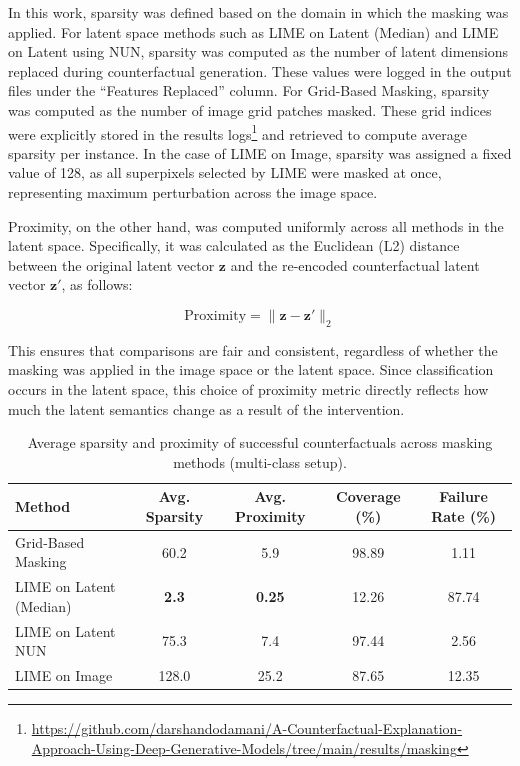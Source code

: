 In this work, sparsity was defined based on the domain in which the masking was applied. For latent space methods such as LIME on Latent (Median) and LIME on Latent using NUN, sparsity was computed as the number of latent dimensions replaced during counterfactual generation. These values were logged in the output files under the “Features Replaced” column. For Grid-Based Masking, sparsity was computed as the number of image grid patches masked. These grid indices were explicitly stored in the results logs\footnote{\url{https://github.com/darshandodamani/A-Counterfactual-Explanation-Approach-Using-Deep-Generative-Models/tree/main/results/masking}} and retrieved to compute average sparsity per instance. In the case of LIME on Image, sparsity was assigned a fixed value of 128, as all superpixels selected by LIME were masked at once, representing maximum perturbation across the image space.

Proximity, on the other hand, was computed uniformly across all methods in the latent space. Specifically, it was calculated as the Euclidean (L2) distance between the original latent vector $\mathbf{z}$ and the re-encoded counterfactual latent vector $\mathbf{z'}$, as follows:

\[
\text{Proximity} = \|\mathbf{z} - \mathbf{z'}\|_2
\]

This ensures that comparisons are fair and consistent, regardless of whether the masking was applied in the image space or the latent space. Since classification occurs in the latent space, this choice of proximity metric directly reflects how much the latent semantics change as a result of the intervention.

\vspace{1em}
\begin{table}[htbp]
\centering
\small
\begin{tabular}{lcccc}
\toprule
\textbf{Method} & \textbf{Avg. Sparsity} & \textbf{Avg. Proximity} & \textbf{Coverage (\%)} & \textbf{Failure Rate (\%)} \\
\midrule
Grid-Based Masking       & 60.2    & 5.9   & 98.89 & 1.11 \\
LIME on Latent (Median)  & \textbf{2.3}     & \textbf{0.25}  & 12.26 & 87.74 \\
LIME on Latent NUN       & 75.3    & 7.4   & 97.44 & 2.56 \\
LIME on Image            & 128.0   & 25.2  & 87.65 & 12.35 \\
\bottomrule
\end{tabular}
\caption{Average sparsity and proximity of successful counterfactuals across masking methods (multi-class setup).}
\label{tab:sparsity_proximity}
\end{table}

